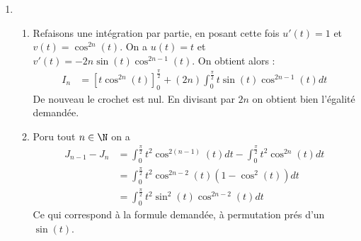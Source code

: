 \documentclass[a4paper, 11pt,reqno]{article}
\begin{document}
\begin{correction}
\begin{enumerate}
\begin{enumerate}
\end{enumerate}
\item 
\begin{enumerate}
\item 
Refaisons une intégration par partie, en posant cette fois 
$u'(t)= 1 $ et $v(t) =\cos^{2n}(t)$. On a $u(t)= t$ et $v'(t) = -2n \sin(t) \cos^{2n-1}(t)$. On obtient alors : 
\begin{align*}
I_n &= \left[ t \cos^{2n}(t)\right]_0^{\frac{\pi}{2}}  +(2n) \int_0^{\frac{\pi}{2}}  t \sin(t) \cos^{2n-1} (t)dt
\end{align*}
De nouveau le crochet est nul. En divisant par $2n$ on obtient bien l'égalité demandée. 
\item Poru tout $n\in \N$ on a 
\begin{align*}
J_{n-1}-J_n &= \int_0^{\frac{\pi}{2}} t^2 \cos^{2(n-1)}(t) dt- \int_0^{\frac{\pi}{2}} t^2 \cos^{2n}(t) dt\\
&=\int_0^{\frac{\pi}{2}} t^2 \cos^{2n-2}(t)(1-\cos^2(t)) dt\\
&=\int_0^{\frac{\pi}{2}} t^2 \sin^2(t)\cos^{2n-2}(t)dt
\end{align*}
Ce qui correspond à la formule demandée, à permutation prés d'un $\sin(t)$.


\end{enumerate}
\end{enumerate}
\end{correction}
\end{document}
